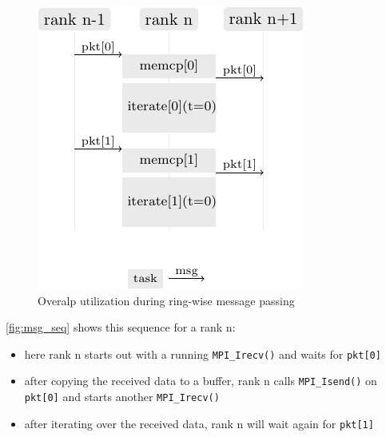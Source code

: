 \documentclass[]{scrartcl}
\begin{document}
\begin{figure}[H]
  \centering
  \includegraphics[width=.6\columnwidth]{./img/msg_seq.pdf}
  \caption{Overalp utilization during ring-wise message passing}
  \label{fig:msg_seq}
\end{figure}

\autoref{fig:msg_seq} shows this sequence for a rank n:
\begin{itemize}
  \item here rank n starts out with a running \verb|MPI_Irecv()| and waits for \verb|pkt[0]|
  \item after copying the received data to a buffer, rank n calls \verb|MPI_Isend()| on \verb|pkt[0]| and starts another \verb|MPI_Irecv()|
  \item after iterating over the received data, rank n will wait again for \verb|pkt[1]|
\end{itemize}
\end{document}
